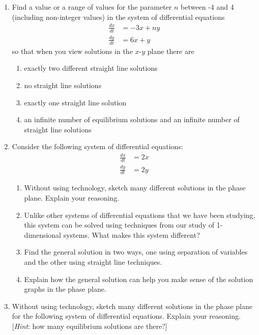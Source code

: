 \begin{enumerate}
\clearpage

\item	Find a value or a range of values for the parameter $n$ between -4 and 4 (including non-integer values) in the system of differential equations \label{10HWproblem5}
\begin{align*}
\frac{dx}{dt}&= -3x+ny\\ \frac{dy}{dt}&= 6x+y
\end{align*}  
so that when you view solutions in the $x$-$y$ plane there are
\begin{enumerate}
\item exactly two different straight line solutions \label{10HWproblem5parta}
\item	no straight line solutions \label{10HWproblem5partb}
\item	exactly one straight line solution \label{10HWproblem5partc}
\item	an infinite number of equilibrium solutions and an infinite number of straight line solutions \label{10HWproblem5partd}
\end{enumerate}

\item	Consider the following system of differential equations: \label{10HWproblem6}
\begin{align*}
\frac{dx}{dt}&= 2x \\ \frac{dy}{dt}&= 2y
\end{align*}  
\begin{enumerate}
\item Without using technology, sketch many different solutions in the phase plane. Explain your reasoning.  \label{10HWproblem6parta}
\item	Unlike other systems of differential equations that we have been studying, this system can be solved using techniques from our study of 1-dimensional systems.  What makes this system different?  \label{10HWproblem6partb}
\item	Find the general solution in two ways, one using separation of variables and the other using straight line techniques. \label{10HWproblem6partc}
\item	Explain how the general solution can help you make sense of the solution graphs in the phase plane.  \label{10HWproblem6partd}
\end{enumerate}

\item Without using technology, sketch many different solutions in the phase plane for the following system of differential equations. Explain your reasoning. [\textit{Hint}: how many equilibrium solutions are there?] \label{10HWproblem7}


\end{enumerate}
